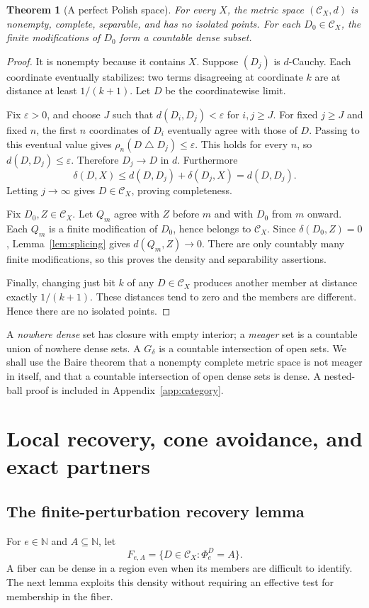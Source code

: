 \documentclass[11pt,a4paper]{article}
\newcommand{\N}{\mathbb N}
\newcommand{\CD}[1]{\mathcal C_{#1}}
\newcommand{\sdelta}{\mathbin{\triangle}}
\newtheorem{theorem}{Theorem}[section]
\theoremstyle{definition}\newtheorem{definition}[theorem]{Definition}
\theoremstyle{remark}\newtheorem{remark}[theorem]{Remark}
\begin{document}
\begin{theorem}[A perfect Polish space]\label{thm:polish}
For every $X$, the metric space $(\CD X,d)$ is nonempty, complete, separable, and has no isolated points. For each $D_0\in\CD X$, the finite modifications of $D_0$ form a countable dense subset.
\end{theorem}
\begin{proof}
It is nonempty because it contains $X$. Suppose $(D_j)$ is $d$-Cauchy. Each coordinate eventually stabilizes: two terms disagreeing at coordinate $k$ are at distance at least $1/(k+1)$. Let $D$ be the coordinatewise limit.

Fix $\varepsilon>0$, and choose $J$ such that $d(D_i,D_j)<\varepsilon$ for $i,j\ge J$. For fixed $j\ge J$ and fixed $n$, the first $n$ coordinates of $D_i$ eventually agree with those of $D$. Passing to this eventual value gives $\rho_n(D\sdelta D_j)\le\varepsilon$. This holds for every $n$, so $d(D,D_j)\le\varepsilon$. Therefore $D_j\to D$ in $d$. Furthermore
\[
 \delta(D,X)\le d(D,D_j)+\delta(D_j,X)=d(D,D_j).
\]
Letting $j\to\infty$ gives $D\in\CD X$, proving completeness.

Fix $D_0,Z\in\CD X$. Let $Q_m$ agree with $Z$ before $m$ and with $D_0$ from $m$ onward. Each $Q_m$ is a finite modification of $D_0$, hence belongs to $\CD X$. Since $\delta(D_0,Z)=0$, Lemma~\ref{lem:splicing} gives $d(Q_m,Z)\to0$. There are only countably many finite modifications, so this proves the density and separability assertions.

Finally, changing just bit $k$ of any $D\in\CD X$ produces another member at distance exactly $1/(k+1)$. These distances tend to zero and the members are different. Hence there are no isolated points.
\end{proof}

A \emph{nowhere dense} set has closure with empty interior; a \emph{meager} set is a countable union of nowhere dense sets. A $G_\delta$ is a countable intersection of open sets. We shall use the Baire theorem that a nonempty complete metric space is not meager in itself, and that a countable intersection of open dense sets is dense. A nested-ball proof is included in Appendix~\ref{app:category}.

\section{Local recovery, cone avoidance, and exact partners}
\label{sec:recovery}
\subsection{The finite-perturbation recovery lemma}
For $e\in\N$ and $A\subseteq\N$, let
\[
 F_{e,A}=\{D\in\CD X:\Phi_e^D=A\}.
\]
A fiber can be dense in a region even when its members are difficult to identify. The next lemma exploits this density without requiring an effective test for membership in the fiber.
\end{document}

